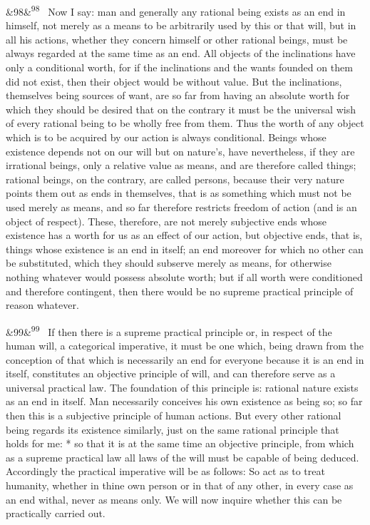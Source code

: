\documentclass[12pt]{article}
\newcommand{\para}[1][]{\par\noindent\ifx&#1&\else\textsuperscript{\footnotesize #1}~\fi}
\begin{document}
\para[98] Now I say: man and generally any rational being exists as an end in himself, not merely as a means to be arbitrarily used by this or that will, but in all his actions, whether they concern himself or other rational beings, must be always regarded at the same time as an end. All objects of the inclinations have only a conditional worth, for if the inclinations and the wants founded on them did not exist, then their object would be without value. But the inclinations, themselves being sources of want, are so far from having an absolute worth for which they should be desired that on the contrary it must be the universal wish of every rational being to be wholly free from them. Thus the worth of any object which is to be acquired by our action is always conditional. Beings whose existence depends not on our will but on nature's, have nevertheless, if they are irrational beings, only a relative value as means, and are therefore called things; rational beings, on the contrary, are called persons, because their very nature points them out as ends in themselves, that is as something which must not be used merely as means, and so far therefore restricts freedom of action (and is an object of respect). These, therefore, are not merely subjective ends whose existence has a worth for us as an effect of our action, but objective ends, that is, things whose existence is an end in itself; an end moreover for which no other can be substituted, which they should subserve merely as means, for otherwise nothing whatever would possess absolute worth; but if all worth were conditioned and therefore contingent, then there would be no supreme practical principle of reason whatever.

\para[99] If then there is a supreme practical principle or, in respect of the human will, a categorical imperative, it must be one which, being drawn from the conception of that which is necessarily an end for everyone because it is an end in itself, constitutes an objective principle of will, and can therefore serve as a universal practical law. The foundation of this principle is: rational nature exists as an end in itself. Man necessarily conceives his own existence as being so; so far then this is a subjective principle of human actions. But every other rational being regards its existence similarly, just on the same rational principle that holds for me: * so that it is at the same time an objective principle, from which as a supreme practical law all laws of the will must be capable of being deduced. Accordingly the practical imperative will be as follows: So act as to treat humanity, whether in thine own person or in that of any other, in every case as an end withal, never as means only. We will now inquire whether this can be practically carried out.
\end{document}
